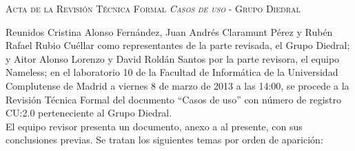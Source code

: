 \documentclass[twoside, a4paper, 11pt]{article}
\begin{document}
	\begin{center}
		\scshape \large Acta de la Revisión Técnica Formal \textit{Casos de uso} - Grupo Diedral \vspace{.5cm}
	\end{center}

	Reunidos Cristina Alonso Fernández, Juan Andrés Claramunt Pérez y Rubén Rafael Rubio Cuéllar como representantes de la parte revisada, el Grupo Diedral; y Aitor Alonso Lorenzo %
y David Roldán Santos por la parte revisora, el equipo Nameless; en el laboratorio 10 de la Facultad de Informática de la Universidad Complutense de Madrid a viernes 8 de marzo de 2013 a las 14:00, se procede a la Revisión Técnica Formal del documento ``Casos de uso'' con número de registro CU:2.0 perteneciente al Grupo Diedral.\\

	El equipo revisor presenta un documento, anexo a al presente, con sus conclusiones previas. Se tratan los siguientes temas por orden de aparición:
\end{document}
